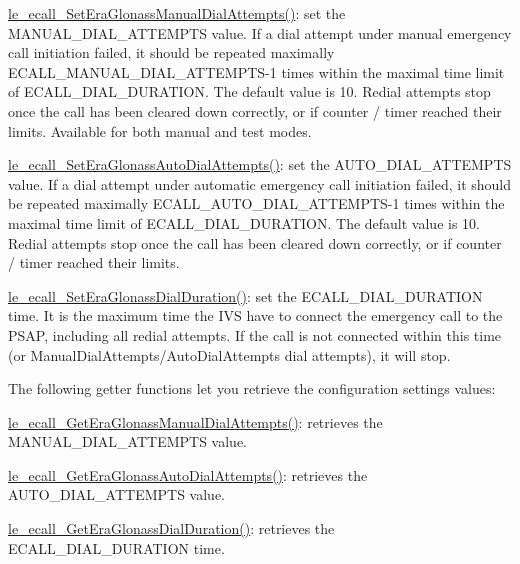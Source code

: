\begin{DoxyItemize}
\item \hyperlink{le__ecall__interface_8h_a15127a7b0500796257795aaf64acd1e2}{le\+\_\+ecall\+\_\+\+Set\+Era\+Glonass\+Manual\+Dial\+Attempts()}\+: set the M\+A\+N\+U\+A\+L\+\_\+\+D\+I\+A\+L\+\_\+\+A\+T\+T\+E\+M\+P\+TS value. If a dial attempt under manual emergency call initiation failed, it should be repeated maximally E\+C\+A\+L\+L\+\_\+\+M\+A\+N\+U\+A\+L\+\_\+\+D\+I\+A\+L\+\_\+\+A\+T\+T\+E\+M\+P\+T\+S-\/1 times within the maximal time limit of E\+C\+A\+L\+L\+\_\+\+D\+I\+A\+L\+\_\+\+D\+U\+R\+A\+T\+I\+ON. The default value is 10. Redial attempts stop once the call has been cleared down correctly, or if counter / timer reached their limits. Available for both manual and test modes.
\item \hyperlink{le__ecall__interface_8h_a836aaf195c0648d41f4a13f8c7ced736}{le\+\_\+ecall\+\_\+\+Set\+Era\+Glonass\+Auto\+Dial\+Attempts()}\+: set the A\+U\+T\+O\+\_\+\+D\+I\+A\+L\+\_\+\+A\+T\+T\+E\+M\+P\+TS value. If a dial attempt under automatic emergency call initiation failed, it should be repeated maximally E\+C\+A\+L\+L\+\_\+\+A\+U\+T\+O\+\_\+\+D\+I\+A\+L\+\_\+\+A\+T\+T\+E\+M\+P\+T\+S-\/1 times within the maximal time limit of E\+C\+A\+L\+L\+\_\+\+D\+I\+A\+L\+\_\+\+D\+U\+R\+A\+T\+I\+ON. The default value is 10. Redial attempts stop once the call has been cleared down correctly, or if counter / timer reached their limits.
\item \hyperlink{le__ecall__interface_8h_a6c934a9e5aad11eb6f009a6bf34fca19}{le\+\_\+ecall\+\_\+\+Set\+Era\+Glonass\+Dial\+Duration()}\+: set the E\+C\+A\+L\+L\+\_\+\+D\+I\+A\+L\+\_\+\+D\+U\+R\+A\+T\+I\+ON time. It is the maximum time the I\+VS have to connect the emergency call to the P\+S\+AP, including all redial attempts. If the call is not connected within this time (or Manual\+Dial\+Attempts/\+Auto\+Dial\+Attempts dial attempts), it will stop.
\end{DoxyItemize}

The following getter functions let you retrieve the configuration settings values\+:


\begin{DoxyItemize}
\item \hyperlink{le__ecall__interface_8h_a579169dbcb91369caa156d2c0e3462c1}{le\+\_\+ecall\+\_\+\+Get\+Era\+Glonass\+Manual\+Dial\+Attempts()}\+: retrieves the M\+A\+N\+U\+A\+L\+\_\+\+D\+I\+A\+L\+\_\+\+A\+T\+T\+E\+M\+P\+TS value.
\item \hyperlink{le__ecall__interface_8h_af8beed56bd3be9bee8a771e05c498ac8}{le\+\_\+ecall\+\_\+\+Get\+Era\+Glonass\+Auto\+Dial\+Attempts()}\+: retrieves the A\+U\+T\+O\+\_\+\+D\+I\+A\+L\+\_\+\+A\+T\+T\+E\+M\+P\+TS value.
\item \hyperlink{le__ecall__interface_8h_afeb92d26dd8a2c092e96b07f3dc0391d}{le\+\_\+ecall\+\_\+\+Get\+Era\+Glonass\+Dial\+Duration()}\+: retrieves the E\+C\+A\+L\+L\+\_\+\+D\+I\+A\+L\+\_\+\+D\+U\+R\+A\+T\+I\+ON time.
\end{DoxyItemize}


